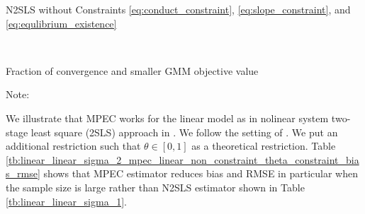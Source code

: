 \documentclass[11pt, a4paper]{article}
\begin{document}
\begin{landscape}{
\begin{table}[!htbp]
  \begin{center}
      \caption{N2SLS without Constraints \eqref{eq:conduct_constraint}, \eqref{eq:slope_constraint}, and \eqref{eq:equlibrium_existence}}
      \label{tb:loglinear_loglinear_sigma_1_simultaneous_non_constraint_non_constraint_bias_rmse} 
      \subfloat[N2SLS ($\sigma=0.5$)]{}\\
      \subfloat[N2SLS ($\sigma=1.0$)]{}
  \end{center}
  \footnotesize
\end{table} 
}
\end{landscape}


\begin{table}[!htbp]
  \begin{center}
      \caption{Fraction of convergence and smaller GMM objective value}
      
  \end{center}
  \footnotesize
  Note: 
\end{table} 






We illustrate that MPEC works for the linear model as in nolinear system two-stage least square (2SLS) approach in \cite{matsumura2023resolving}. 
We follow the setting of \cite{matsumura2023resolving}.
We put an additional restriction such that $\theta\in[0,1]$ as a theoretical restriction. 
Table \ref{tb:linear_linear_sigma_2_mpec_linear_non_constraint_theta_constraint_bias_rmse} shows that MPEC estimator reduces bias and RMSE in particular when the sample size is large rather than N2SLS estimator shown in Table \ref{tb:linear_linear_sigma_1}.
\end{document}
